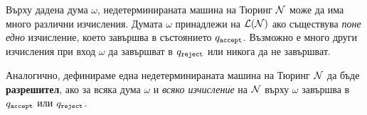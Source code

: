 \begin{remark}
  Върху дадена дума $\omega$, недетерминираната машина на Тюринг $\mathcal{N}$ може да има много различни изчисления.
  Думата $\omega$ принадлежи на $\mathcal{L}(\mathcal{N})$ ако съществува {\em поне едно} изчисление, което завършва в състоянието $q_{\texttt{accept}}$.
  Възможно е много други изчисления при вход $\omega$ да завършват в $q_{\texttt{reject}}$ или никога да не завършват.
\end{remark}

Аналогично, дефинираме една недетерминираната машина на Тюринг $\mathcal{N}$ да бъде {\bf разрешител}, ако за всяка дума $\omega$ и 
\emph{всяко изчисление} на $\mathcal{N}$ върху $\omega$ завършва в $q_{\texttt{accept}}$ или $q_{\texttt{reject}}$.


